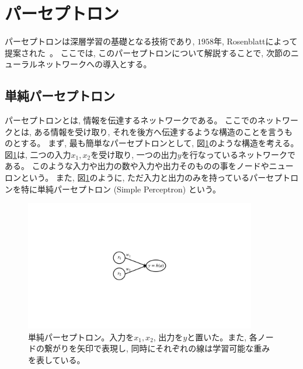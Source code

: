 \section{パーセプトロン} \label{DL:Perceptron}

パーセプトロンは深層学習の基礎となる技術であり, $1958$年, Rosenblattによって提案された~\cite{PerceptronPaper}。
ここでは, このパーセプトロンについて解説することで, 次節のニューラルネットワークへの導入とする。


\subsection{単純パーセプトロン} \label{DL:Percep:SimplePerceptron}

パーセプトロンとは, 情報を伝達するネットワークである\cite{ZeroDeepLearning1}。
ここでのネットワークとは, ある情報を受け取り, それを後方へ伝達するような構造のことを言うものとする。
まず, 最も簡単なパーセプトロンとして, 図\ref{2SimplePerceptron}のような構造を考える。
図\ref{2SimplePerceptron}は, 二つの入力$x_1,x_2$を受け取り, 一つの出力$y$を行なっているネットワークである。
このような入力や出力の数や入力や出力そのものの事をノードやニューロンという。
また, 図\ref{2SimplePerceptron}のように, ただ入力と出力のみを持っているパーセプトロンを特に単純パーセプトロン (Simple Perceptron) という。

\begin{figure}[htbp]
 \centering
 \includegraphics[trim = 250 350 250 350, width=0.9\textwidth, clip]{Figure/2DeepLearning/2SimplePerceptron.png}
 \caption[単純パーセプトロン]{単純パーセプトロン。入力を$x_1,x_2$, 出力を$y$と置いた。また, 各ノードの繋がりを矢印で表現し, 同時にそれぞれの線は学習可能な重みを表している。}
 \label{2SimplePerceptron}
\end{figure}

